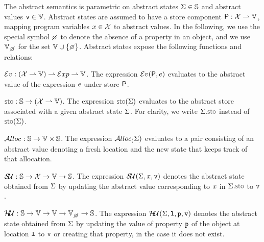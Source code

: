 The abstract semantics is parametric on abstract states $\Sigma \in \mathbb{S}$ and abstract values $\mathtt{v} \in \mathbb{V}$.
Abstract states are assumed to have a store component ${\sf P}: \mathcal{X} \rightharpoonup \mathbb{V}$, mapping program variables $x \in \mathcal{X}$ to abstract values. 
In the following, we use the special symbol $\none$ to denote the absence of a property in an object, and we use $\setext{\absvals}{\none}$ for the set $\absvals \cup \{ \none \}$.
Abstract states expose the following functions and relations: 
\begin{description}
\setlength{\itemsep}{0.2em}
  \item[\jsil Expression Evaluation,] $\mathcal{E}v_{} :  (\mathcal{X} \rightharpoonup \mathbb{V})  \rightharpoonup \mathcal{E}xp \rightharpoonup \mathbb{V}$. 
  	The expression $\mathcal{E}v_{}({\sf P}, e)$ evaluates to the abstract value of the \jsil expression $e$ under store ${\sf P}$. 
            
  \item[Store Selector,] $\stosel : \absstates \rightarrow (\jvars \partialmap \absvals)$. The expression $\stosel(\absstate)$ evaluates to the abstract store associated with a given abstract state $\Sigma$. For clarity, we write $\absstate.\stosel$ instead of $\stosel(\absstate)$. 

  \item[Heap Allocation,] $\mathcal{A}lloc_{}: \mathbb{S} \rightarrow \mathbb{V} \times \mathbb{S}$.   The expression $\mathcal{A}lloc_{(}\Sigma)$ evaluates to a pair consisting
          of an abstract value denoting a fresh location and the new state that keeps track of that allocation. %
%             
  \item[Store Update,] $\mathcal{S\!U}_{}: \mathbb{S} \rightarrow \mathcal{X} \rightarrow \mathbb{V} \rightarrow \mathbb{S}$. 
             The expression $\mathcal{S\!U}_{}(\Sigma, x, \mathtt{v})$ denotes the abstract state obtained from $\Sigma$ 
             by updating the abstract value corresponding to $x$ in $\absstate.\stosel$ to $\mathtt{v}$. 

   \item[Heap Update,] $\hpupdt{} : \absstates \rightarrow \absvals \rightarrow \absvals \rightarrow \setext{\absvals}{\none} \rightarrow \absstates$. 
             The expression $\mathcal{H\!U}_{}(\Sigma, \mathtt{l}, \mathtt{p}, \mathtt{v})$ denotes the abstract state obtained from $\Sigma$ 
             by updating the value of property $\mathtt{p}$ of the object at location $\mathtt{l}$ to $\mathtt{v}$ or creating that property, in the
             case it does not exist.
                   

\end{description}
